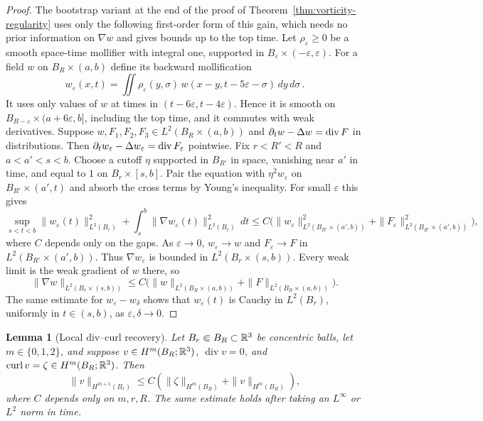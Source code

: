 \documentclass[11pt,letterpaper]{article}
\numberwithin{equation}{section}
\theoremstyle{plain}
\newtheorem{lemma}[theorem]{Lemma}
\theoremstyle{definition}
\theoremstyle{remark}
\begin{document}
\begin{proof}
The bootstrap variant at the end of the proof of Theorem~\ref{thm:vorticity-regularity} uses only the following first-order form of this gain, which needs no prior information on $\nabla w$ and gives bounds up to the top time. Let $\rho_\varepsilon\ge0$ be a smooth space-time mollifier with integral one, supported in $B_\varepsilon\times(-\varepsilon,\varepsilon)$. For a field $w$ on $B_R\times(a,b)$ define its backward mollification
\[
 w_\varepsilon(x,t)=\iint\rho_\varepsilon(y,\sigma)\,w(x-y,t-5\varepsilon-\sigma)\,dy\,d\sigma\,.
\]
It uses only values of $w$ at times in $(t-6\varepsilon,t-4\varepsilon)$. Hence it is smooth on $B_{R-\varepsilon}\times(a+6\varepsilon,b]$, including the top time, and it commutes with weak derivatives. Suppose $w,F_1,F_2,F_3\in L^2(B_R\times(a,b))$ and $\partial_t w-\Delta w=\operatorname{div}F$ in distributions. Then $\partial_t w_\varepsilon-\Delta w_\varepsilon=\operatorname{div}F_\varepsilon$ pointwise. Fix $r<R'<R$ and $a<a'<s<b$. Choose a cutoff $\eta$ supported in $B_{R'}$ in space, vanishing near $a'$ in time, and equal to $1$ on $B_r\times[s,b]$. Pair the equation with $\eta^2w_\varepsilon$ on $B_{R'}\times(a',t)$ and absorb the cross terms by Young's inequality. For small $\varepsilon$ this gives
\[
 \sup_{s<t<b}\|w_\varepsilon(t)\|_{L^2(B_r)}^2+\int_s^b\|\nabla w_\varepsilon(t)\|_{L^2(B_r)}^2\,dt
 \le C\bigl(\|w_\varepsilon\|_{L^2(B_{R'}\times(a',b))}^2+\|F_\varepsilon\|_{L^2(B_{R'}\times(a',b))}^2\bigr),
\]
where $C$ depends only on the gaps. As $\varepsilon\to0$, $w_\varepsilon\to w$ and $F_\varepsilon\to F$ in $L^2(B_{R'}\times(a',b))$. Thus $\nabla w_\varepsilon$ is bounded in $L^2(B_r\times(s,b))$. Every weak limit is the weak gradient of $w$ there, so
\[
 \|\nabla w\|_{L^2(B_r\times(s,b))}
 \le C\bigl(\|w\|_{L^2(B_R\times(a,b))}+\|F\|_{L^2(B_R\times(a,b))}\bigr).
\]
The same estimate for $w_\varepsilon-w_\delta$ shows that $w_\varepsilon(t)$ is Cauchy in $L^2(B_r)$, uniformly in $t\in(s,b)$, as $\varepsilon,\delta\to0$.
\end{proof}

\begin{lemma}[Local div--curl recovery]\label{lem:local-div-curl}
Let $B_r\Subset B_R\subset\mathbb{R}^3$ be concentric balls, let $m\in\{0,1,2\}$, and suppose $v\in H^m(B_R;\mathbb{R}^3)$, $\operatorname{div}v=0$, and $\operatorname{curl} v=\zeta\in H^m(B_R;\mathbb{R}^3)$. Then
\begin{equation}\label{eq:local-div-curl}
 \|v\|_{H^{m+1}(B_r)}
 \le C\left(\|\zeta\|_{H^m(B_R)}+\|v\|_{H^m(B_R)}\right),
\end{equation}
where $C$ depends only on $m,r,R$. The same estimate holds after taking an $L^\infty$ or $L^2$ norm in time.
\end{lemma}
\end{document}
